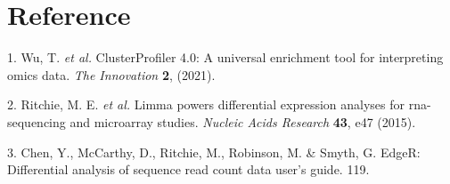 \documentclass[
]{article}
\newenvironment{cslreferences}%
  {}%
  {\par}
\begin{document}
\hypertarget{bibliography}{%
\section*{Reference}\label{bibliography}}

\hypertarget{refs}{}
\begin{cslreferences}
\leavevmode\hypertarget{ref-ClusterprofilerWuTi2021}{}%
1. Wu, T. \emph{et al.} ClusterProfiler 4.0: A universal enrichment tool for interpreting omics data. \emph{The Innovation} \textbf{2}, (2021).

\leavevmode\hypertarget{ref-LimmaPowersDiRitchi2015}{}%
2. Ritchie, M. E. \emph{et al.} Limma powers differential expression analyses for rna-sequencing and microarray studies. \emph{Nucleic Acids Research} \textbf{43}, e47 (2015).

\leavevmode\hypertarget{ref-EdgerDifferenChen}{}%
3. Chen, Y., McCarthy, D., Ritchie, M., Robinson, M. \& Smyth, G. EdgeR: Differential analysis of sequence read count data user's guide. 119.
\end{cslreferences}
\end{document}
